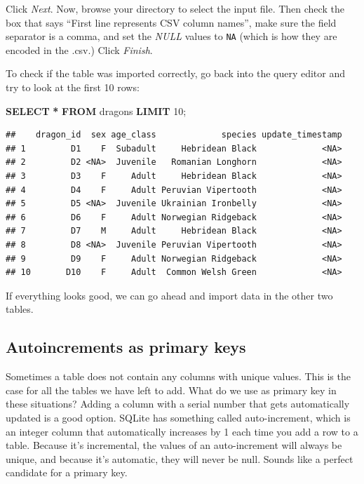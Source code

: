 \documentclass[
]{book}
\newenvironment{Shaded}{\begin{snugshade}}{\end{snugshade}}
\newcommand{\DecValTok}[1]{\textcolor[rgb]{0.00,0.00,0.81}{#1}}
\newcommand{\KeywordTok}[1]{\textcolor[rgb]{0.13,0.29,0.53}{\textbf{#1}}}
\newcommand{\NormalTok}[1]{#1}
\newcommand{\OperatorTok}[1]{\textcolor[rgb]{0.81,0.36,0.00}{\textbf{#1}}}
\begin{document}
Click \emph{Next}. Now, browse your directory to select the input file. Then check
the box that says ``First line represents CSV column names'', make sure the field
separator is a comma, and set the \emph{NULL} values to \texttt{NA} (which is how they are
encoded in the .csv.) Click \emph{Finish}.

To check if the table was imported correctly, go back into the query editor and
try to look at the first 10 rows:

\begin{Shaded}
\begin{Highlighting}[]
\KeywordTok{SELECT} \OperatorTok{*} \KeywordTok{FROM}\NormalTok{ dragons }\KeywordTok{LIMIT} \DecValTok{10}\NormalTok{;}
\end{Highlighting}
\end{Shaded}

\begin{verbatim}
##    dragon_id  sex age_class             species update_timestamp
## 1         D1    F  Subadult     Hebridean Black             <NA>
## 2         D2 <NA>  Juvenile   Romanian Longhorn             <NA>
## 3         D3    F     Adult     Hebridean Black             <NA>
## 4         D4    F     Adult Peruvian Vipertooth             <NA>
## 5         D5 <NA>  Juvenile Ukrainian Ironbelly             <NA>
## 6         D6    F     Adult Norwegian Ridgeback             <NA>
## 7         D7    M     Adult     Hebridean Black             <NA>
## 8         D8 <NA>  Juvenile Peruvian Vipertooth             <NA>
## 9         D9    F     Adult Norwegian Ridgeback             <NA>
## 10       D10    F     Adult  Common Welsh Green             <NA>
\end{verbatim}

If everything looks good, we can go ahead and import data in the other two
tables.

\hypertarget{autoincrements-as-primary-keys}{%
\subsection{Autoincrements as primary keys}\label{autoincrements-as-primary-keys}}

Sometimes a table does not contain any columns with unique values. This is the
case for all the tables we have left to add. What do we use as primary key in
these situations? Adding a column with a serial number that gets automatically
updated is a good option. SQLite has something called auto-increment, which is
an integer column that automatically increases by 1 each time you add a row to
a table. Because it's incremental, the values of an auto-increment will always
be unique, and because it's automatic, they will never be null. Sounds like a
perfect candidate for a primary key.
\end{document}

